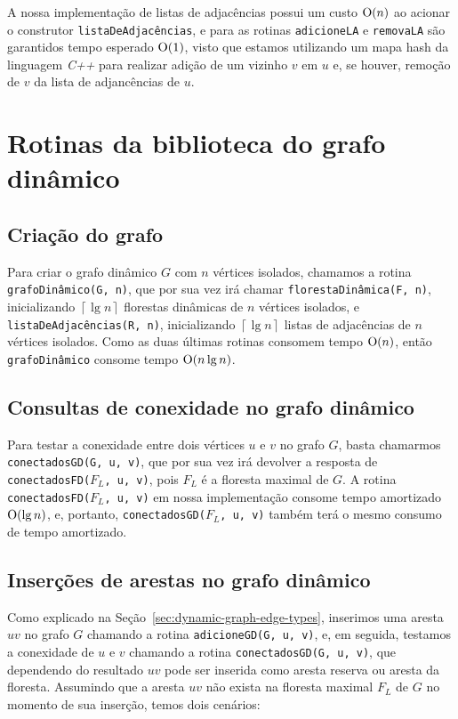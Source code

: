 A nossa implementação \cite{chung2025} de listas de adjacências possui um custo $\mathrm{O}(n)$ ao acionar o construtor \texttt{listaDeAdjacências}, e para 
as rotinas \texttt{adicioneLA} e \texttt{removaLA} são garantidos tempo esperado $\mathrm{O}(1)$, visto que estamos utilizando um mapa hash da linguagem \textit{C++} para realizar adição de um vizinho $v$ em $u$ e, se houver, remoção de $v$ da lista de adjancências de $u$.

\section{Rotinas da biblioteca do grafo dinâmico}

\subsection{Criação do grafo}
\label{sec:dynamic-graph-creation}

Para criar o grafo dinâmico $G$ com $n$ vértices isolados, chamamos a rotina \texttt{grafoDinâmico(G, n)}, que por sua vez irá chamar \texttt{florestaDinâmica(F, n)}, inicializando $\left\lceil \lg n \right\rceil$ florestas dinâmicas de $n$ vértices isolados, e \texttt{listaDeAdjacências(R, n)}, inicializando $\left\lceil \lg n \right\rceil$ listas de adjacências de $n$ vértices isolados. Como as duas últimas rotinas consomem tempo $\mathrm{O}(n)$, então \texttt{grafoDinâmico} consome tempo $\mathrm{O}(n \lg n)$.

\subsection{Consultas de conexidade no grafo dinâmico}
\label{sec:dynamic-graph-connectivity-queries}

Para testar a conexidade entre dois vértices $u$ e $v$ no grafo $G$, basta chamarmos \texttt{conectadosGD(G, u, v)}, que por sua vez irá devolver a resposta de \texttt{conectadosFD($F_L$, u, v)}, pois $F_L$ é a floresta maximal de $G$. A rotina \texttt{conectadosFD($F_L$, u, v)} em nossa implementação consome tempo amortizado $\mathrm{O}(\lg n)$, e, portanto, \texttt{conectadosGD($F_L$, u, v)} também terá o mesmo consumo de tempo amortizado.

\subsection{Inserções de arestas no grafo dinâmico}

Como explicado na Seção~\ref{sec:dynamic-graph-edge-types}, inserimos uma aresta $uv$ no grafo $G$ chamando a rotina \texttt{adicioneGD(G, u, v)}, e, em seguida, testamos a conexidade de $u$ e $v$ chamando a rotina \texttt{conectadosGD(G, u, v)}, que dependendo do resultado $uv$ pode ser inserida como aresta reserva ou aresta da floresta. Assumindo que a aresta $uv$ não exista na floresta maximal $F_L$ de $G$ no momento de sua inserção, temos dois cenários:

